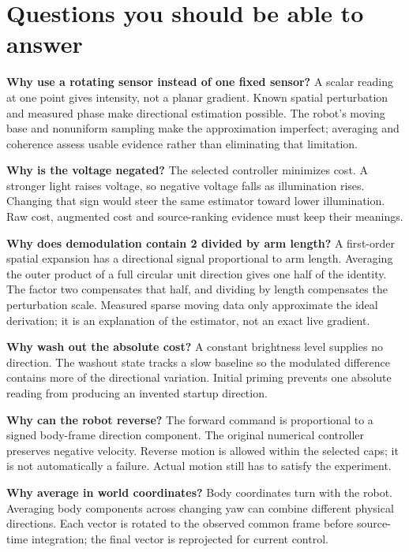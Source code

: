 \documentclass[
  10pt,
  letterpaper,
]{article}
\begin{document}
\section{Questions you should be able to
answer}\label{questions-you-should-be-able-to-answer}

\textbf{Why use a rotating sensor instead of one fixed sensor?} A scalar
reading at one point gives intensity, not a planar gradient. Known
spatial perturbation and measured phase make directional estimation
possible. The robot's moving base and nonuniform sampling make the
approximation imperfect; averaging and coherence assess usable evidence
rather than eliminating that limitation.

\textbf{Why is the voltage negated?} The selected controller minimizes
cost. A stronger light raises voltage, so negative voltage falls as
illumination rises. Changing that sign would steer the same estimator
toward lower illumination. Raw cost, augmented cost and source-ranking
evidence must keep their meanings.

\textbf{Why does demodulation contain 2 divided by arm length?} A
first-order spatial expansion has a directional signal proportional to
arm length. Averaging the outer product of a full circular unit
direction gives one half of the identity. The factor two compensates
that half, and dividing by length compensates the perturbation scale.
Measured sparse moving data only approximate the ideal derivation; it is
an explanation of the estimator, not an exact live gradient.

\textbf{Why wash out the absolute cost?} A constant brightness level
supplies no direction. The washout state tracks a slow baseline so the
modulated difference contains more of the directional variation. Initial
priming prevents one absolute reading from producing an invented startup
direction.

\textbf{Why can the robot reverse?} The forward command is proportional
to a signed body-frame direction component. The original numerical
controller preserves negative velocity. Reverse motion is allowed within
the selected caps; it is not automatically a failure. Actual motion
still has to satisfy the experiment.

\textbf{Why average in world coordinates?} Body coordinates turn with
the robot. Averaging body components across changing yaw can combine
different physical directions. Each vector is rotated to the observed
common frame before source-time integration; the final vector is
reprojected for current control.
\end{document}
